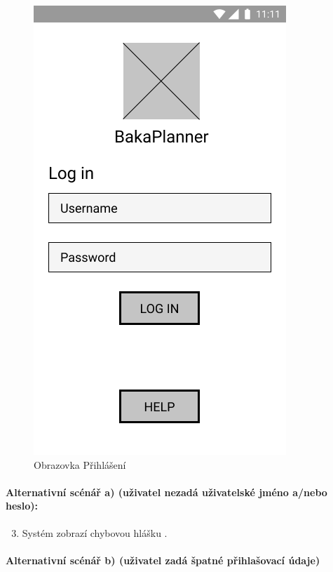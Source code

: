 \documentclass[twoside]{ctuthesis}
\begin{document}
	\begin{figure}[h]
		\includegraphics[scale=.35]{img/sign_in_form.png}
		\caption{Obrazovka Přihlášení}
		\label{fig:signin}
	\end{figure}

\paragraph{Alternativní scénář a) (uživatel nezadá uživatelské jméno a/nebo heslo):}

	\begin{enumerate}[label=\arabic*a]
		\setcounter{enumi}{2}
		\item Systém zobrazí chybovou hlášku .
	\end{enumerate}

\paragraph{Alternativní scénář b) (uživatel zadá špatné přihlašovací údaje)}
\end{document}
